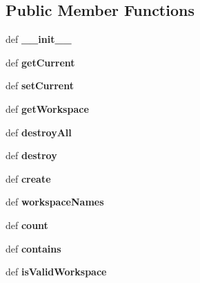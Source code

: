 \subsection*{Public Member Functions}
\begin{DoxyCompactItemize}
\item 
\hypertarget{classgauss_1_1_workspace_manager_a447eb6edb32dfaadf6de1defc7ae8b38}{def {\bfseries \-\_\-\-\_\-init\-\_\-\-\_\-}}\label{classgauss_1_1_workspace_manager_a447eb6edb32dfaadf6de1defc7ae8b38}

\item 
\hypertarget{classgauss_1_1_workspace_manager_a6477c8b480a5e96204d9d8e4d6e6ca0f}{def {\bfseries get\-Current}}\label{classgauss_1_1_workspace_manager_a6477c8b480a5e96204d9d8e4d6e6ca0f}

\item 
\hypertarget{classgauss_1_1_workspace_manager_a60b113753f11b7406983df799fea84ef}{def {\bfseries set\-Current}}\label{classgauss_1_1_workspace_manager_a60b113753f11b7406983df799fea84ef}

\item 
\hypertarget{classgauss_1_1_workspace_manager_a2b73412c80d15a8e1ea2d8fea7a40576}{def {\bfseries get\-Workspace}}\label{classgauss_1_1_workspace_manager_a2b73412c80d15a8e1ea2d8fea7a40576}

\item 
\hypertarget{classgauss_1_1_workspace_manager_a74ddaa27e0252dd1d877f7c6cd8cf2d5}{def {\bfseries destroy\-All}}\label{classgauss_1_1_workspace_manager_a74ddaa27e0252dd1d877f7c6cd8cf2d5}

\item 
\hypertarget{classgauss_1_1_workspace_manager_a9a4769c47d7bace3f39542687da8625c}{def {\bfseries destroy}}\label{classgauss_1_1_workspace_manager_a9a4769c47d7bace3f39542687da8625c}

\item 
\hypertarget{classgauss_1_1_workspace_manager_a5216ed6054ad35e853a6aa8f949791fd}{def {\bfseries create}}\label{classgauss_1_1_workspace_manager_a5216ed6054ad35e853a6aa8f949791fd}

\item 
\hypertarget{classgauss_1_1_workspace_manager_a1bbf936e4e7efb0ac50ebdbe984e3d73}{def {\bfseries workspace\-Names}}\label{classgauss_1_1_workspace_manager_a1bbf936e4e7efb0ac50ebdbe984e3d73}

\item 
\hypertarget{classgauss_1_1_workspace_manager_a5bb20622f92c43a17ff9e23d0504d81c}{def {\bfseries count}}\label{classgauss_1_1_workspace_manager_a5bb20622f92c43a17ff9e23d0504d81c}

\item 
\hypertarget{classgauss_1_1_workspace_manager_aeb3ade96b8a2a29b68051eb3c09ec685}{def {\bfseries contains}}\label{classgauss_1_1_workspace_manager_aeb3ade96b8a2a29b68051eb3c09ec685}

\item 
\hypertarget{classgauss_1_1_workspace_manager_afa3f99ded5c92b15c1715788559c1b5e}{def {\bfseries is\-Valid\-Workspace}}\label{classgauss_1_1_workspace_manager_afa3f99ded5c92b15c1715788559c1b5e}

\end{DoxyCompactItemize}
